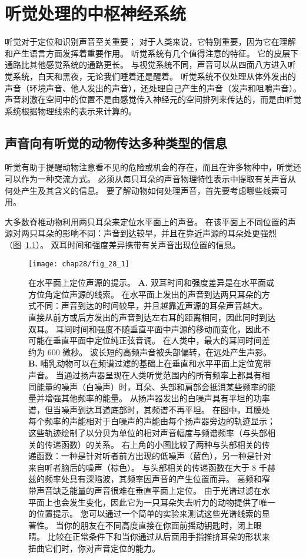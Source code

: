 \chapter{听觉处理的中枢神经系统} \label{chap:chap28}

听觉对于定位和识别声音至关重要；
对于人类来说，它特别重要，因为它在理解和产生语言方面发挥着重要作用。
听觉系统有几个值得注意的特征。
它的皮层下通路比其他感觉系统的通路更长。
与视觉系统不同，声音可以从四面八方进入听觉系统，白天和黑夜，无论我们睡着还是醒着。
听觉系统不仅处理从体外发出的声音（环境声音、他人发出的声音），还处理自己产生的声音（发声和咀嚼声音）。
声音刺激在空间中的位置不是由感觉传入神经元的空间排列来传达的，而是由听觉系统根据物理线索的表示来计算的。



\section{声音向有听觉的动物传达多种类型的信息}


听觉有助于提醒动物注意看不见的危险或机会的存在，而且在许多物种中，听觉还可以作为一种交流方式。
必须从每只耳朵的声音物理特性表示中提取有关声音从何处产生及其含义的信息。
要了解动物如何处理声音，首先要考虑哪些线索可用。


大多数脊椎动物利用两只耳朵来定位水平面上的声音。
在该平面上不同位置的声源对两只耳朵的影响不同：声音到达较早，并且在靠近声源的耳朵处更强烈（图~\ref{fig:28_1}）。
双耳时间和强度差异携带有关声音出现位置的信息。



\begin{figure}[htbp]
	\centering
	\texttt{[image: chap28/fig\_28\_1]}
	\caption{在水平面上定位声源的提示。
	\textbf{A.} 双耳时间和强度差异是在水平面或方位角定位声源的线索。
	在水平面上发出的声音到达两只耳朵的方式不同：声音到达的时间较早，并且越靠近声源的耳朵声音越大。
	直接从前方或后方发出的声音到达左右耳的距离相同，因此同时到达双耳。
	耳间时间和强度不随垂直平面中声源的移动而变化，因此不可能在垂直平面中定位纯正弦音调。
	在人类中，最大的耳间时间差约为 600 微秒。
	波长短的高频声音被头部偏转，在远处产生声影\cite{geisler1998sound}。
	\textbf{B.} 哺乳动物可以在频谱过滤的基础上在垂直和水平平面上定位宽带声音。
	当通过扬声器呈现在人类听觉范围内的所有频率上都具有相同能量的噪声（白噪声）时，耳朵、头部和肩部会抵消某些频率的能量并增强其他频率的能量。
	从扬声器发出的白噪声具有平坦的功率谱，但当噪声到达耳道底部时，其频谱不再平坦。
	在图中，耳膜处每个频率的声能相对于白噪声的声能由每个扬声器旁边的轨迹显示； 
	这些轨迹绘制了以分贝为单位的相对声音幅度与频谱频率（与头部相关的传递函数）的关系。
	右上角的小图比较了两种与头部相关的传递函数：一种是针对听者前方出现的低噪声（蓝色），另一种是针对来自听者脑后的噪声（棕色）。
	与头部相关的传递函数在大于 8 千赫兹的频率处具有深陷波，其频率因声音的产生位置而异。
	高频和窄带声音缺乏能量的声音很难在垂直平面上定位。
	由于光谱过滤在水平面上也会发生变化，因此它为一只耳朵失去听力的动物提供了唯一的位置提示。
	您可以通过一个简单的实验来测试这些光谱线索的显著性。
	当你的朋友在不同高度直接在你面前摇动钥匙时，闭上眼睛。
	比较在正常条件下和当你通过从后面用手指推挤耳朵的形状来扭曲它们时，你对声音定位的能力。}
	\label{fig:28_1}
\end{figure}


